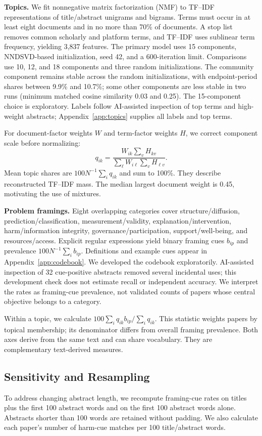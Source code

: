 \textbf{Topics.} We fit nonnegative matrix factorization (NMF) to TF--IDF representations of title/abstract unigrams and bigrams. Terms must occur in at least eight documents and in no more than 70\% of documents. A stop list removes common scholarly and platform terms, and TF--IDF uses sublinear term frequency, yielding 3,837 features. The primary model uses 15 components, NNDSVD-based initialization, seed 42, and a 600-iteration limit. Comparisons use 10, 12, and 18 components and three random initializations. The community component remains stable across the random initializations, with endpoint-period shares between 9.9\% and 10.7\%; some other components are less stable in two runs (minimum matched cosine similarity 0.03 and 0.25). The 15-component choice is exploratory. Labels follow AI-assisted inspection of top terms and high-weight abstracts; Appendix~\ref{app:topics} supplies all labels and top terms.

For document-factor weights $W$ and term-factor weights $H$, we correct component scale before normalizing:
\[
q_{ik}=\frac{W_{ik}\sum_v H_{kv}}{\sum_\ell W_{i\ell}\sum_v H_{\ell v}}.
\]
Mean topic shares are $100N^{-1}\sum_iq_{ik}$ and sum to 100\%. They describe reconstructed TF--IDF mass. The median largest document weight is 0.45, motivating the use of mixtures.

\textbf{Problem framings.} Eight overlapping categories cover structure/diffusion, prediction/classification, measurement/validity, explanation/intervention, harm/information integrity, governance/participation, support/well-being, and resources/access. Explicit regular expressions yield binary framing cues $b_{ip}$ and prevalence $100N^{-1}\sum_i b_{ip}$. Definitions and example cues appear in Appendix~\ref{app:codebook}. We developed the codebook exploratorily. AI-assisted inspection of 32 cue-positive abstracts removed several incidental uses; this development check does not estimate recall or independent accuracy. We interpret the rates as framing-cue prevalence, not validated counts of papers whose central objective belongs to a category.

Within a topic, we calculate $100\sum_i q_{ik}b_{ip}/\sum_i q_{ik}$. This statistic weights papers by topical membership; its denominator differs from overall framing prevalence. Both axes derive from the same text and can share vocabulary. They are complementary text-derived measures.

\subsection{Sensitivity and Resampling}
To address changing abstract length, we recompute framing-cue rates on titles plus the first 100 abstract words and on the first 100 abstract words alone. Abstracts shorter than 100 words are retained without padding. We also calculate each paper's number of harm-cue matches per 100 title/abstract words.

